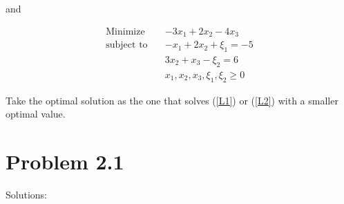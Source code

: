 \documentclass[12pt]{article}
\begin{document}
and 

\begin{equation}\label{L2}
\begin{aligned}
\text{Minimize} \quad & -3x_1 + 2x_2 - 4 x_3 \\
\text{subject\  to} \quad & -x_1 + 2 x_2 + \xi_1 = -5 \\
& 3 x_2 + x_3 - \xi_2 = 6 \\
& x_1, x_2, x_3, \xi_1, \xi_2 \geqslant 0
\end{aligned}
\end{equation}

Take the optimal solution as the one that solves (\ref{L1}) or (\ref{L2}) with a smaller optimal value.



\section*{Problem 2.1}

Solutions: 
\end{document}

